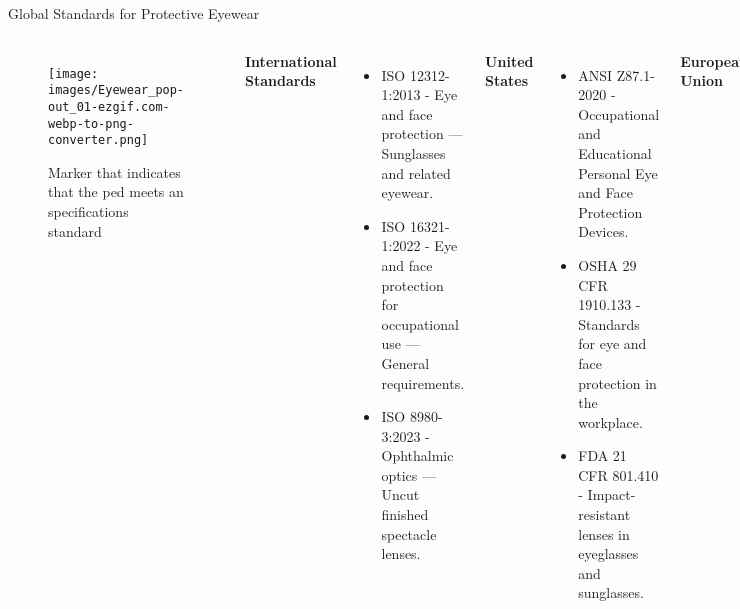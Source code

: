 \begin{frame}[shrink=60, plain]{Global Standards for Protective Eyewear}
    
    \begin{columns}
        \begin{figure}
            \texttt{[image: images/Eyewear\_pop-out\_01-ezgif.com-webp-to-png-converter.png]} %
            \caption{Marker that indicates that the \gls{ped} meets an specifications standard}
        \end{figure}
        
        \textbf{International Standards}
        \begin{itemize}
            \item ISO 12312-1:2013 - Eye and face protection — Sunglasses and related eyewear.
            \item ISO 16321-1:2022 - Eye and face protection for occupational use — General requirements.
            \item ISO 8980-3:2023 - Ophthalmic optics — Uncut finished spectacle lenses.
        \end{itemize}
    
        \textbf{United States}
        \begin{itemize}
            \item ANSI Z87.1-2020 - Occupational and Educational Personal Eye and Face Protection Devices.
            \item OSHA 29 CFR 1910.133 - Standards for eye and face protection in the workplace.
            \item FDA 21 CFR 801.410 - Impact-resistant lenses in eyeglasses and sunglasses.
        \end{itemize}
    
        \textbf{European Union}
        \begin{itemize}
            \item EN 166:2001 - Personal eye-protection specifications.
            \item EN 170:2002 - UV filters for industrial eye protection.
            \item EN 172:1994 - Sunglare filters for industrial use.
        \end{itemize}
    
        \textbf{Australia/New Zealand}
        \begin{itemize}
            \item AS/NZS 1337.1:2010 - Eye and face protectors for occupational applications.
            \item AS/NZS 1067.1:2016 - Sunglasses and fashion spectacles.
        \end{itemize}
    

\end{columns}
\end{frame}
